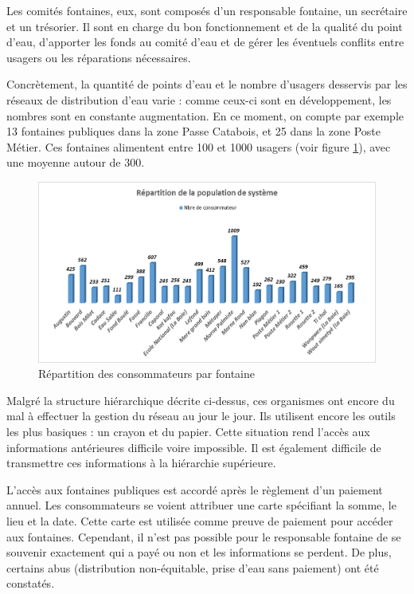 \documentclass{EPL-master-thesis-covers-FR}
\begin{document}
				Les comités fontaines, eux, sont composés d'un responsable fontaine, un secrétaire et un trésorier. Il sont en charge du bon fonctionnement et de la qualité du point d'eau, d'apporter les fonds au comité d'eau et de gérer les éventuels conflits entre usagers ou les réparations nécessaires.

				Concrètement, la quantité de points d'eau et le nombre d'usagers desservis par les réseaux de distribution d'eau varie : comme ceux-ci sont en développement, les nombres sont en constante augmentation. En ce moment, on compte par exemple 13 fontaines publiques dans la zone Passe Catabois, et 25 dans la zone Poste Métier. Ces fontaines alimentent entre 100 et 1000 usagers (voir figure \ref{fig:conso_fontaine}), avec une moyenne autour de 300.

				\begin{figure}
					\includegraphics[width=\textwidth]{images/conso_fontaine}
					\caption{Répartition des consommateurs par fontaine}
					\label{fig:conso_fontaine}
				\end{figure}

				Malgré la structure hiérarchique décrite ci-dessus, ces organismes ont encore du mal à effectuer la gestion du réseau au jour le jour. Ils utilisent encore les outils les plus basiques : un crayon et du papier. Cette situation rend l'accès aux informations antérieures difficile voire impossible. Il est également difficile de transmettre ces informations à la hiérarchie supérieure.

				L'accès aux fontaines publiques est accordé après le règlement d'un paiement annuel. Les consommateurs se voient attribuer une carte spécifiant la somme, le lieu et la date. Cette carte est utilisée comme preuve de paiement pour accéder aux fontaines. Cependant, il n'est pas possible pour le responsable fontaine de se souvenir exactement qui a payé ou non et les informations se perdent. De plus, certains abus (distribution non-équitable, prise d'eau sans paiement) ont été constatés.
\end{document}
